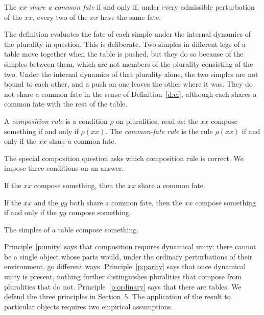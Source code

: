 \documentclass{situationist-preprint}
\begin{document}
\begin{definition}\label{d:cf}
The $xx$ \emph{share a common fate} if and only if, under every admissible perturbation of the $xx$, every two of the $xx$ have the same fate.
\end{definition}

The definition evaluates the fate of each simple under the internal dynamics of the plurality in question. This is deliberate. Two simples in different legs of a table move together when the table is pushed, but they do so because of the simples between them, which are not members of the plurality consisting of the two. Under the internal dynamics of that plurality alone, the two simples are not bound to each other, and a push on one leaves the other where it was. They do not share a common fate in the sense of Definition~\ref{d:cf}, although each shares a common fate with the rest of the table.

\begin{definition}\label{d:rule}
A \emph{composition rule} is a condition $\rho$ on pluralities, read as: the $xx$ compose something if and only if $\rho(xx)$. The \emph{common-fate rule} is the rule $\rho(xx)$ if and only if the $xx$ share a common fate.
\end{definition}

The special composition question asks which composition rule is correct. We impose three conditions on an answer.

\begin{principle}[Unity]\label{p:unity}
If the $xx$ compose something, then the $xx$ share a common fate.
\end{principle}

\begin{principle}[Parity]\label{p:parity}
If the $xx$ and the $yy$ both share a common fate, then the $xx$ compose something if and only if the $yy$ compose something.
\end{principle}

\begin{principle}\label{p:ordinary}
The simples of a table compose something.
\end{principle}

Principle~\ref{p:unity} says that composition requires dynamical unity: there cannot be a single object whose parts would, under the ordinary perturbations of their environment, go different ways. Principle~\ref{p:parity} says that once dynamical unity is present, nothing further distinguishes pluralities that compose from pluralities that do not. Principle~\ref{p:ordinary} says that there are tables. We defend the three principles in Section~5. The application of the result to particular objects requires two empirical assumptions.
\end{document}
